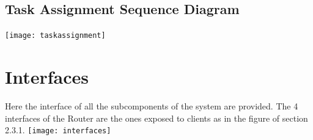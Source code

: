 \subsection{Task Assignment Sequence Diagram}
\texttt{[image: taskassignment]}
\newpage
\section{Interfaces}
Here the interface of all the subcomponents of the system are provided. The 4 interfaces of the Router are the ones exposed to clients as in the figure of section 2.3.1.
\texttt{[image: interfaces]}

